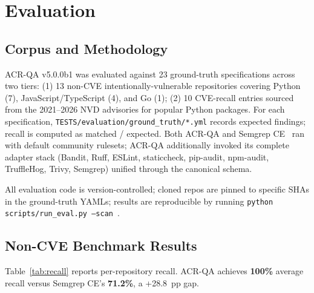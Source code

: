 \documentclass[conference]{IEEEtran}
\begin{document}
\section{Evaluation}
\label{sec:eval}

\subsection{Corpus and Methodology}

ACR-QA v5.0.0b1 was evaluated against 23 ground-truth specifications across two tiers: (1) 13 non-CVE intentionally-vulnerable repositories covering Python (7), JavaScript/TypeScript (4), and Go (1); (2) 10 CVE-recall entries sourced from the 2021--2026 NVD advisories for popular Python packages. For each specification, \texttt{TESTS/evaluation/ground\_truth/*.yml} records expected findings; recall is computed as matched / expected. Both ACR-QA and Semgrep CE~\cite{semgrep_tool} ran with default community rulesets; ACR-QA additionally invoked its complete adapter stack (Bandit, Ruff, ESLint, staticcheck, pip-audit, npm-audit, TruffleHog, Trivy, Semgrep) unified through the canonical schema.

All evaluation code is version-controlled; cloned repos are pinned to specific SHAs in the ground-truth YAMLs; results are reproducible by running \texttt{python scripts/run\_eval.py --scan}~\cite{ko2015practical}.

\subsection{Non-CVE Benchmark Results}

Table~\ref{tab:recall} reports per-repository recall. ACR-QA achieves \textbf{100\%} average recall versus Semgrep CE's \textbf{71.2\%}, a +28.8~pp gap.
\end{document}
